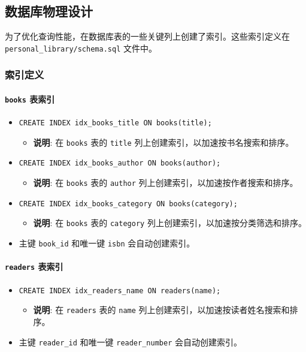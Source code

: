 \documentclass[11pt, a4paper]{article}
\begin{document}
\subsection{数据库物理设计}
为了优化查询性能，在数据库表的一些关键列上创建了索引。这些索引定义在 \texttt{personal\_library/schema.sql} 文件中。

\subsubsection{索引定义}
\paragraph{\texttt{books} 表索引}
\begin{itemize}
    \item \texttt{CREATE INDEX idx\_books\_title ON books(title);}
    \begin{itemize}
        \item \textbf{说明}: 在 \texttt{books} 表的 \texttt{title} 列上创建索引，以加速按书名搜索和排序。
    \end{itemize}
    \item \texttt{CREATE INDEX idx\_books\_author ON books(author);}
    \begin{itemize}
        \item \textbf{说明}: 在 \texttt{books} 表的 \texttt{author} 列上创建索引，以加速按作者搜索和排序。
    \end{itemize}
    \item \texttt{CREATE INDEX idx\_books\_category ON books(category);}
    \begin{itemize}
        \item \textbf{说明}: 在 \texttt{books} 表的 \texttt{category} 列上创建索引，以加速按分类筛选和排序。
    \end{itemize}
    \item 主键 \texttt{book\_id} 和唯一键 \texttt{isbn} 会自动创建索引。
\end{itemize}

\paragraph{\texttt{readers} 表索引}
\begin{itemize}
    \item \texttt{CREATE INDEX idx\_readers\_name ON readers(name);}
    \begin{itemize}
        \item \textbf{说明}: 在 \texttt{readers} 表的 \texttt{name} 列上创建索引，以加速按读者姓名搜索和排序。
    \end{itemize}
    \item 主键 \texttt{reader\_id} 和唯一键 \texttt{reader\_number} 会自动创建索引。
\end{itemize}
\end{document}
